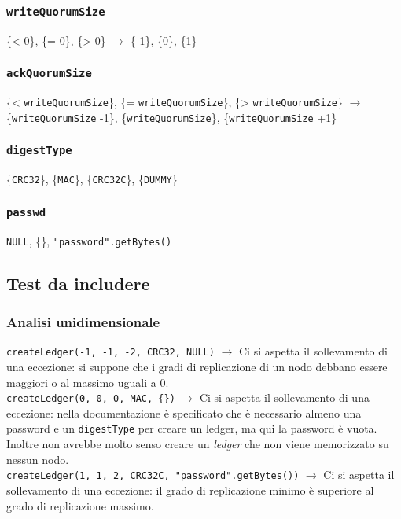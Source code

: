 \documentclass[a4paper, 12pt]{article}
\newcommand{\key}[1]{\texttt{#1}}
\begin{document}
\subsubsection{\key{writeQuorumSize}}
\{< 0\}, \{= 0\}, \{> 0\} $\rightarrow$ \{-1\}, \{0\}, \{1\}

\subsubsection{\key{ackQuorumSize}}
\{< \key{writeQuorumSize}\}, \{= \key{writeQuorumSize}\}, \{> \key{writeQuorumSize}\} $\rightarrow$ \{\key{writeQuorumSize} -1\}, \{\key{writeQuorumSize}\}, \{\key{writeQuorumSize} +1\}

\subsubsection{\key{digestType}}
\{\key{CRC32}\}, \{\key{MAC}\}, \{\key{CRC32C}\}, \{\key{DUMMY}\}

\subsubsection{\key{passwd}}
\key{NULL}, \{\}, \key{"password".getBytes()}


\subsection{Test da includere}
\newcommand{\f}[1]{\key{createLedger(#1)}}
\subsubsection{Analisi unidimensionale}
\f{-1, -1, -2, \key{CRC32}, \key{NULL}} $\rightarrow$ Ci si aspetta il sollevamento di una eccezione: si suppone che i gradi di replicazione di un nodo debbano essere maggiori o al massimo uguali a 0. \\

\f{0, 0, 0, \key{MAC}, \key{\{\}}} $\rightarrow$ Ci si aspetta il sollevamento di una eccezione: nella documentazione è specificato che è necessario almeno una password e un \key{digestType} per creare un ledger, ma qui la password è vuota. Inoltre non avrebbe molto senso creare un \textit{ledger} che non viene memorizzato su nessun nodo. \\

\f{1, 1, 2, \key{CRC32C}, \key{"password".getBytes()}} $\rightarrow$ Ci si aspetta il sollevamento di una eccezione: il grado di replicazione minimo è superiore al grado di replicazione massimo. \\
\end{document}
